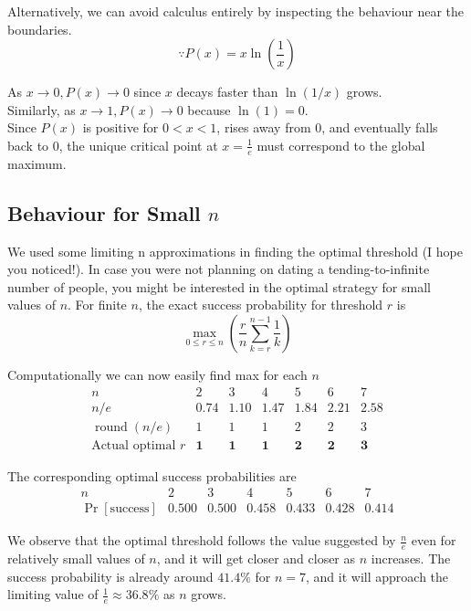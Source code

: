 \noindent Alternatively, we can avoid calculus entirely by inspecting the behaviour near the boundaries. 
\[
\because P(x)=x\ln\left(\frac1x\right)
\]

As $x \to 0,P(x) \to 0$ since \(x\) decays faster than \(\ln(1/x)\) grows. \\


\noindent Similarly, as $x \to 1,P(x) \to 0$ because $\ln(1)=0$.\\


\noindent Since \(P(x)\) is positive for \(0<x<1\), rises away from \(0\), and eventually 
falls back to \(0\), the unique critical point at $x=\frac1e$ must correspond to the global maximum.

\subsection*{Behaviour for Small \(n\)}

We used some limiting n approximations in finding the optimal threshold (I hope you noticed!).
In case you were not planning on dating a tending-to-infinite number of people, you might be interested in the optimal strategy for small values of \(n\).
For finite \(n\), the exact success probability for threshold \(r\) is
\[
\max_{0\le r\le n} \left(\frac{r}{n}\sum_{k=r}^{n-1}\frac1k\right)
\]

Computationally we can now easily find max for each \(n\)
\[
\begin{array}{c|cccccc}
n & 2 & 3 & 4 & 5 & 6 & 7\\
\hline
n/e
& 0.74
& 1.10
& 1.47
& 1.84
& 2.21
& 2.58
\\
\hline
\operatorname{round}(n/e)
& 1
& 1
& 1
& 2
& 2
& 3
\\
\hline
\text{Actual optimal }r
& \mathbf{1}
& \mathbf{1}
& \mathbf{1}
& \mathbf{2}
& \mathbf{2}
& \mathbf{3}
\end{array}
\]

\vspace{1em}

The corresponding optimal success probabilities are
\[
\begin{array}{c|cccccc}
n & 2 & 3 & 4 & 5 & 6 & 7\\
\hline
\Pr[\text{success}]
&
\mathbf{0.500}
&
\mathbf{0.500}
&
\mathbf{0.458}
&
\mathbf{0.433}
&
\mathbf{0.428}
&
\mathbf{0.414}
\end{array}
\]

We observe that the optimal threshold follows the value suggested by
$\frac{n}{e}$ even for relatively small values of \(n\), and it will get closer and closer as \(n\) increases. 
The success probability is already around \(41.4\%\) for \(n=7\), and it will approach the limiting value of \(\frac{1}{e}\approx 36.8\%\) as \(n\) grows.

